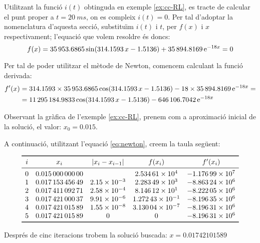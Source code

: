 \begin{exemple}
    Utilitzant la funci\'{o} $i(t)$ obtinguda en exemple \vref{ex:cc-RL}, es tracte de calcular el punt proper a $t = \SI{20}{ms}$, on es compleix $i(t)=0$. Per tal d'adoptar la nomenclatura d'aquesta secci\'{o}, substitu\"{\i}m $i(t)$ i $t$, per $f(x)$ i $x$ respectivament; l'equaci\'{o} que volem resoldre \'{e}s doncs:
    \[
        f(x) = \num{35953,6865}\sin(\num{314,1593}\,x-\num{1,5136}) + \num{35894,8169}\,\mathrm{e}^{-18 x} = 0
    \]

    Per tal de poder utilitzar el m\`{e}tode de Newton, comencem calculant la funci\'{o} derivada:
    \begin{align*}
        f'(x) &= \num{314,1593}\times\num{35953,6865}\cos(\num{314,1593}\,x-\num{1,5136}) -18\times \num{35894,8169}\,\mathrm{e}^{-18 x}= \\
        {} &= \num{11295184,9833}\cos(\num{314,1593}\,x-\num{1,5136}) - \num{646106,7042}\,\mathrm{e}^{-18 x}
    \end{align*}

    Observant la gr\`{a}fica de l'exemple \vref{ex:cc-RL}, prenem com a  aproximaci\'{o} inicial de la soluci\'{o}, el valor: $x_0 = \num{0,015}$.

    A continuaci\'{o}, utilitzant l'equaci\'{o} \eqref{eq:newton}, creem la taula seg\"{u}ent:

    \[ \begin{array}{ccccc}
   \toprule[1pt]
        i & x_i  & |x_i - x_{i-1}| & f(x_i) & f'(x_i) \\
   \midrule
        0 &	\num{0,01500000000} &	{}             & \num{2,53461E+04}	& \num{-1,17699E+07} \\
        1 &	\num{0,01715345649} &	\num{2,15E-03} & \num{2,28349E+03}	& \num{-8,86324E+06} \\	
        2 &	\num{0,01741109271} &	\num{2,58E-04} & \num{8,14612E+01}	& \num{-8,22205E+06} \\	
        3 &	\num{0,01742100037} &	\num{9,91E-06} & \num{1,27243E-01}	& \num{-8,19635E+06} \\	
        4 &	\num{0,01742101589} &	\num{1,55E-08} & \num{3,13004E-07}	& \num{-8,19631E+06} \\	
        5 &	\num{0,01742101589} &	0              & 0               	& \num{-8,19631E+06} \\	
   \bottomrule[1pt]
   \end{array}   \]

Despr\'{e}s de cinc iteracions trobem la soluci\'{o} buscada: $x=\num{0,01742101589}$


\end{exemple}
